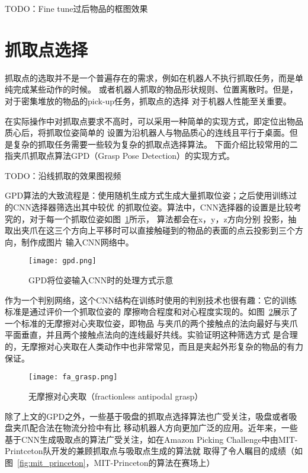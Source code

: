 TODO：Fine tune过后物品的框图效果

\section{抓取点选择}

抓取点的选取并不是一个普遍存在的需求，例如在机器人不执行抓取任务，而是单纯完成某些动作的时候。
或者机器人抓取的物品形状规则、位置离散时。但是，对于密集堆放的物品的pick-up任务，抓取点的选择
对于机器人性能至关重要。

在实际操作中对抓取点要求不高时，可以采用一种简单的实现方式，即定位出物品质心后，将抓取位姿简单的
设置为沿机器人与物品质心的连线且平行于桌面。但是复杂的抓取任务需要一些较为复杂的抓取点选择算法。
下面介绍比较常用的二指夹爪抓取点算法GPD（Grasp Pose Detection）\cite{ten2017grasp}的实现方式。

TODO：沿线抓取的效果图视频

GPD算法的大致流程是：使用随机生成方式生成大量抓取位姿；之后使用训练过的CNN选择器筛选出其中较优
的抓取位姿。算法中，CNN选择器的设置是比较考究的，对于每一个抓取位姿如图~\ref{fig:gpd}所示，
算法都会在x，y，z方向分别
投影，抽取出夹爪在这三个方向上平移时可以直接触碰到的物品的表面的点云投影到三个方向，制作成图片
输入CNN网络中。

\begin{figure}[h] %
  \centering
  \texttt{[image: gpd.png]}
  \caption{GPD将位姿输入CNN时的处理方式示意}
  \label{fig:gpd}
\end{figure}

作为一个判别网络，这个CNN结构在训练时使用的判别技术也很有趣：它的训练标准是通过评价一个抓取位姿的
摩擦吻合程度和对心程度实现的。如图~\ref{fig:fa_grasp}展示了一个标准的无摩擦对心夹取位姿，即物品
与夹爪的两个接触点的法向最好与夹爪平面垂直，并且两个接触点法向的连线最好共线。实验证明这种筛选方式
是合理的，无摩擦对心夹取在人类动作中也非常常见，而且是夹起外形复杂的物品的有力保证。


\begin{figure}[h] %
  \centering
  \texttt{[image: fa\_grasp.png]}
  \caption{无摩擦对心夹取（fractionless antipodal grasp）}
  \label{fig:fa_grasp}
\end{figure}

除了上文的GPD之外，一些基于吸盘的抓取点选择算法也广受关注，吸盘或者吸盘夹爪配合法在物流分捡中有比
移动机器人方向更加广泛的应用。近年来，一些基于CNN生成吸取点的算法广受关注，如在Amazon Picking 
Challenge中由MIT-Printceton队开发的兼顾抓取点与吸取点生成的算法\cite{zeng2018robotic}就
取得了令人瞩目的成绩（如图~\ref{fig:mit_princeton}，MIT-Princeton的算法在赛场上）

